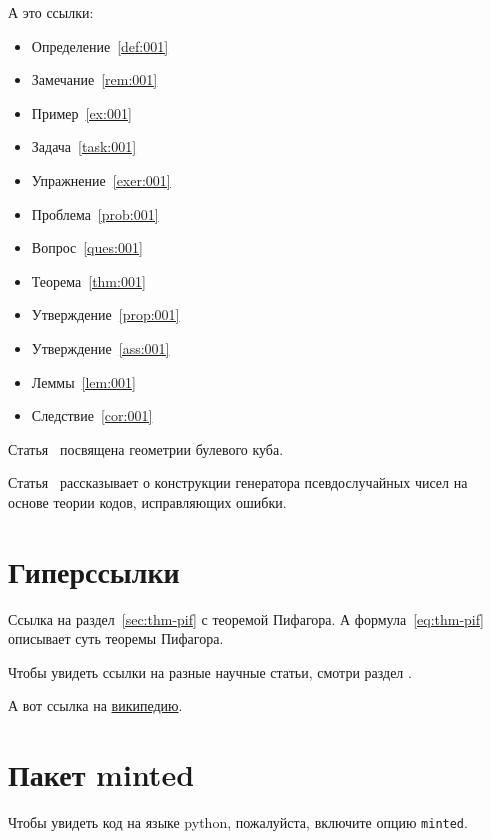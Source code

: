 \documentclass[colorthm, bib]{../civarticle}
\begin{document}
\begin{assertion*}
  \Blindtext[2]
\end{assertion*}

\begin{corollary}
  \label{cor:001}
  \Blindtext[2]
\end{corollary}

\begin{corollary*}
  \Blindtext[2]
\end{corollary*}

\begin{lemma}
  \label{lem:001}
  \Blindtext[2]
\end{lemma}

\begin{lemma*}
  \Blindtext[2]
\end{lemma*}

А это ссылки:

\begin{itemize}
\item Определение~\ref{def:001}
\item Замечание~\ref{rem:001}
\item Пример~\ref{ex:001}
\item Задача~\ref{task:001}
\item Упражнение~\ref{exer:001}
\item Проблема~\ref{prob:001}
\item Вопрос~\ref{ques:001}
\item Теорема~\ref{thm:001}
\item Утверждение~\ref{prop:001}
\item Утверждение~\ref{ass:001}
\item Леммы~\ref{lem:001}
\item Следствие~\ref{cor:001}
\end{itemize}

Статья~\cite{ahlswede1977} посвящена геометрии булевого куба.

Статья~\cite{ahmed2013} рассказывает о конструкции генератора
псевдослучайных чисел на основе теории кодов, исправляющих ошибки.


\section{Гиперссылки}
\label{sec:hyper}

Ссылка на раздел~\ref{sec:thm-pif} с теоремой Пифагора.  А
формула~\eqref{eq:thm-pif} описывает суть теоремы Пифагора.

Чтобы увидеть ссылки на разные научные статьи, смотри раздел
\hyperref[sec:ref-to-articles]{}.

А вот ссылка на \href{https://ru.wikipedia.org}{википедию}.


\section{Пакет minted}
\label{sec:minted}

Чтобы увидеть код на языке python, пожалуйста, включите опцию \texttt{minted}.
\if \MINTED\empty
\else \inputminted{python}{code.py} \fi
\end{document}
